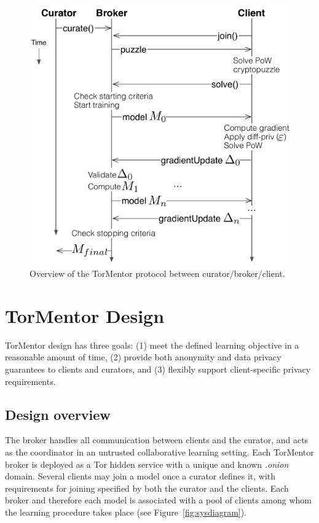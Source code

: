 \begin{figure}[h]
  \centering
  \includegraphics[width=.9\linewidth]{fig/tormentor-protocol.pdf}
  \caption{Overview of the TorMentor protocol between
    curator/broker/client.
    }
  \label{fig:protocol}
\end{figure}


\chapter{TorMentor Design}
\label{sec:design}

TorMentor design has three goals: (1) meet the defined learning
objective in a reasonable amount of time, (2) provide both anonymity
and data privacy guarantees to clients and curators, and (3) flexibly
support client-specific privacy requirements.

\section{Design overview} 

The broker handles all communication between
clients and the curator, and acts as the coordinator in an untrusted
collaborative learning setting. Each TorMentor broker is deployed as a
Tor hidden service with a unique and known \textit{.onion}
domain. Several clients may join a model once a curator defines it,
with requirements for joining specified by both the curator and the
clients. Each broker and therefore each model is associated with a pool
of clients among whom the learning procedure takes place (see 
Figure~\ref{fig:sysdiagram}).

